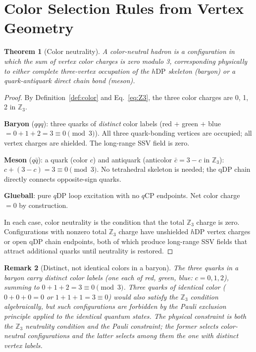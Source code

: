 \documentclass[12pt]{article}
\newtheorem{theorem}{Theorem}[section]
\newtheorem{remark}[theorem]{Remark}
\newcommand{\qCP}{q\mathrm{CP}}
\newcommand{\qDP}{q\mathrm{DP}}
\newcommand{\hDP}{h\mathrm{DP}}
\begin{document}
\section{Color Selection Rules from Vertex Geometry}
\label{sec:color_rules}

\begin{theorem}[Color neutrality]
\label{thm:color_neutral}
A color-neutral hadron is a configuration in which the sum of
vertex color charges is zero modulo 3, corresponding physically
to either complete three-vertex occupation of the $\hDP$ skeleton
(baryon) or a quark-antiquark direct chain bond (meson).
\end{theorem}

\begin{proof}
By Definition~\ref{def:color} and Eq.~\eqref{eq:Z3}, the three
color charges are 0, 1, 2 in $\mathbb{Z}_3$.

\textbf{Baryon} ($qqq$): three quarks of \emph{distinct} color labels
(red $+$ green $+$ blue $= 0 + 1 + 2 = 3 \equiv 0 \pmod{3}$).
All three quark-bonding vertices are occupied; all vertex charges are
shielded.  The long-range SSV field is zero.

\textbf{Meson} ($q\bar{q}$): a quark (color $c$) and antiquark
(anticolor $\bar{c} = 3-c$ in $\mathbb{Z}_3$): $c + (3-c) = 3
\equiv 0 \pmod{3}$.  No tetrahedral skeleton is needed; the qDP
chain directly connects opposite-sign quarks.

\textbf{Glueball}: pure $\qDP$ loop excitation with no $\qCP$
endpoints.  Net color charge $= 0$ by construction.

In each case, color neutrality is the condition that the total
$\mathbb{Z}_3$ charge is zero.  Configurations with nonzero total
$\mathbb{Z}_3$ charge have unshielded $\hDP$ vertex charges or
open qDP chain endpoints, both of which produce long-range SSV
fields that attract additional quarks until neutrality is restored.
\end{proof}

\begin{remark}[Distinct, not identical colors in a baryon]
The three quarks in a baryon carry \emph{distinct} color labels
(one each of red, green, blue: $c = 0, 1, 2$), summing to
$0 + 1 + 2 = 3 \equiv 0 \pmod 3$.  Three quarks of \emph{identical}
color ($0+0+0 = 0$ or $1+1+1 = 3 \equiv 0$) would also satisfy the
$\mathbb{Z}_3$ condition algebraically, but such configurations are
forbidden by the Pauli exclusion principle applied to the identical
quantum states.  The physical constraint is both the $\mathbb{Z}_3$
neutrality condition \emph{and} the Pauli constraint; the former
selects color-neutral configurations and the latter selects among
them the one with distinct vertex labels.
\end{remark}
\end{document}
